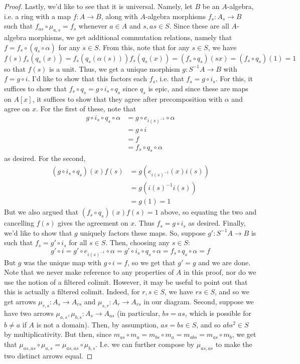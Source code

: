 \documentclass[12pt]{exam}
\begin{document}
\begin{proof}
	Lastly, we'd like to see that it is universal. Namely, let $B$ be an $A$-algebra, i.e. a ring with a map $f : A \to B$, along with $A$-algebra morphisms $f_s : A_s \to B$ such that $f_{as} \circ \mu_{a,s} = f_s$ whenever $a \in A$ and $s,as \in S$. Since these are all $A$-algebra morphisms, we get additional commutation relations, namely that $f = f_s \circ (q_s \circ \alpha)$ for any $s \in S$. From this, note that for any $s \in S$, we have
	\[ f(s)f_s(q_s(x)) = f_s(q_s(\alpha(s)))f_s(q_s(x)) = (f_s \circ q_s)(sx) = (f_s \circ q_s)(1) = 1 \]
	so that $f(s)$ is a unit. Thus, we get a unique morphism $g : S^{-1}A \to B$ with $f = g \circ i$. I'd like to show that this factors each $f_s$, i.e. that $f_s = g \circ i_s$. For this, it suffices to show that $f_s \circ q_s = g \circ i_s \circ q_s$ since $q_s$ is epic, and since these are maps on $A[x]$, it suffices to show that they agree after precomposition with $\alpha$ and agree on $x$. For the first of these, note that
	\begin{align*}
	g \circ i_s \circ q_s \circ \alpha
		&= g \circ e_{i(s)^{-1}} \circ \alpha \\
		&= g \circ i \\
		&= f \\
		&= f_s \circ q_s \circ \alpha
	\end{align*}
	as desired. For the second,
	\begin{align*}
	(g \circ i_s \circ q_s)(x)f(s)
		&= g(e_{i(s)^{-1}}(x)i(s)) \\
		&= g(i(s)^{-1}i(s)) \\
		&= g(1) = 1
	\end{align*}
	But we also argued that $(f_s \circ q_s)(x)f(s) = 1$ above, so equating the two and cancelling $f(s)$ gives the agreement on $x$. Thus $f_s = g \circ i_s$ as desired. Finally, we'd like to show that $g$ uniquely factors these maps. So, suppose $g' : S^{-1}A \to B$ is such that $f_s = g' \circ i_s$ for all $s \in S$. Then, choosing any $s \in S$:
	\[ g' \circ i = g' \circ e_{i(s)^{-1}} \circ \alpha = g' \circ i_s \circ q_s \circ \alpha = f_s \circ q_s \circ \alpha = f \]
	But $g$ was the unique map with $g \circ i = f$, so we get that $g' = g$ and we are done. \\
	
	Note that we never make reference to any properties of $A$ in this proof, nor do we use the notion of a filtered colimit. However, it may be useful to point out that this is actually a filtered colimit. Indeed, for $r,s \in S$, we have $rs \in S$, and so we get arrows $\mu_{r,s} : A_s \to A_{rs}$ and $\mu_{s,r} : A_r \to A_{rs}$ in our diagram. Second, suppose we have two arrows $\mu_{a,s},\mu_{b,s} : A_s \to A_{as}$ (in particular, $bs = as$, which is possible for $b \neq a$ if $A$ is not a domain). Then, by assumption, $as = bs \in S$, and so $abs^2 \in S$ by multiplicativity. But then, since $m_{as} \circ m_a = m_{bs} \circ m_a = m_{abs} = m_{as} \circ m_b$, we get that $\mu_{as,as} \circ \mu_{a,s} = \mu_{as,as} \circ \mu_{b,s}$. I.e. we can further compose by $\mu_{as,as}$ to make the two distinct arrows equal.
\end{proof}
\end{document}
